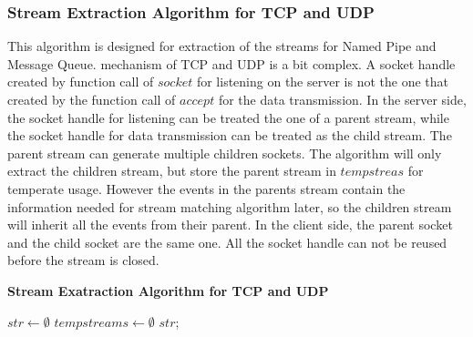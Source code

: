 \subsubsection{Stream Extraction Algorithm for TCP and UDP}
This algorithm is designed for extraction of the streams for Named Pipe and Message Queue. mechanism of TCP and UDP is a bit complex. A socket handle created by function call of $socket$ for listening on the server is not the one that created by the function call of $accept$ for the data transmission. In the server side, the socket handle for listening can be treated the one of a parent stream, while the socket handle for data transmission can be treated as the child stream. The parent stream can generate multiple children sockets. The algorithm will only extract the children stream, but store the parent stream in $tempstreas$ for temperate usage. However the events in the parents stream contain the information needed for stream matching algorithm later, so the children stream will inherit all the events from their parent. In the client side, the parent socket and the child socket are the same one. All the socket handle can not be reused before the stream is closed.
\begin{algorithm}[H]
\DontPrintSemicolon
\caption{{\bf Stream Exatraction Algorithm for TCP and UDP} \label{streamext2}}
$str \leftarrow \emptyset$\; 
$tempstreams \leftarrow \emptyset$\;
\KwRet $str$;\;
\end{algorithm} 

